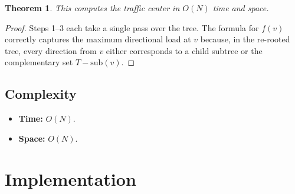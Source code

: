 \documentclass[11pt,a4paper]{article}
\newtheorem{theorem}{Theorem}
\begin{document}
\begin{theorem}
This computes the traffic center in $O(N)$ time and space.
\end{theorem}
\begin{proof}
Steps 1--3 each take a single pass over the tree. The formula for $f(v)$ correctly captures the maximum directional load at $v$ because, in the re-rooted tree, every direction from $v$ either corresponds to a child subtree or the complementary set $T - \mathrm{sub}(v)$.
\end{proof}

\subsection{Complexity}
\begin{itemize}
    \item \textbf{Time:} $O(N)$.
    \item \textbf{Space:} $O(N)$.
\end{itemize}

\section{Implementation}
\end{document}
